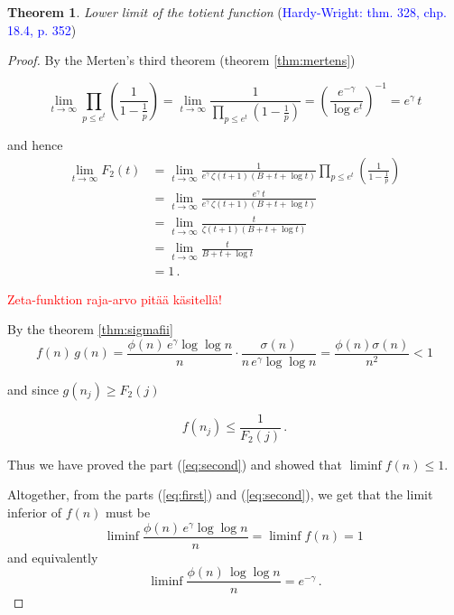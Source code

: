 \documentclass{article}
\theoremstyle{definition}
\newtheorem{theorem}[subsection]{Theorem}
\begin{document}
\begin{theorem}{\emph{Lower limit of the totient function} (\textcolor{blue}{Hardy-Wright: thm. 328, chp. 18.4, p. 352})}
\begin{proof}
By the Merten's third theorem (theorem \ref{thm:mertens})

\begin{equation*}
    \lim_{t \rightarrow \infty} \prod_{p\leq e^t} \left(\frac{1}{1-\frac{1}{p}}\right) = \lim_{t \rightarrow \infty} \frac{1}{\prod_{p\leq e^t} \left(1-\frac{1}{p}\right)} = \left(\frac{e^{-\gamma}}{\log e^t}\right)^{-1} = e^\gamma\,t
\end{equation*}

and hence
\begin{align*}
    \lim_{t \rightarrow \infty} F_2(t) & = \lim_{t \rightarrow \infty} \frac{1}{e^\gamma\,\zeta(t+1)(B+t+\log t)} \prod_{p\leq e^t} \left(\frac{1}{1-\frac{1}{p}}\right)\\
    & = \lim_{t \rightarrow \infty} \frac{e^\gamma\,t}{e^\gamma\,\zeta(t+1)(B+t+\log t)}\\
    & = \lim_{t \rightarrow \infty} \frac{t}{\zeta(t+1)(B+t+\log t)}\\
    & = \lim_{t \rightarrow \infty} \frac{t}{B+t+\log t}\\
    & = 1\,.
\end{align*}

\textcolor{red}{Zeta-funktion raja-arvo pitää käsitellä!}

By the theorem \ref{thm:sigmafii}
\begin{equation*}
    f(n)\,g(n) = \frac{\phi(n)\,e^\gamma \log\log n}{n} \cdot \frac{\sigma(n)}{n\,e^\gamma \log\log n} = \frac{\phi(n)\sigma(n)}{n^2}<1
\end{equation*}

and since $g(n_j) \geq F_2(j)$

\begin{equation*}
    f(n_j)\leq \frac{1}{F_2(j)}\,.
\end{equation*}

Thus we have proved the part (\ref{eq:second}) and showed that $\liminf{f(n)\leq 1}$.

Altogether, from the parts (\ref{eq:first}) and (\ref{eq:second}), we get that the limit inferior of $f(n)$ must be
\begin{equation*}
    \liminf{\frac{\phi(n)\,e^\gamma \log\log n}{n}}=\liminf{f(n)}=1\,
\end{equation*}
and equivalently
\begin{equation*}
    \liminf{\frac{\phi(n)\,\log\log n}{n}}=e^{-\gamma}\,.
\end{equation*}

\end{proof}

\end{theorem}
\end{document}
